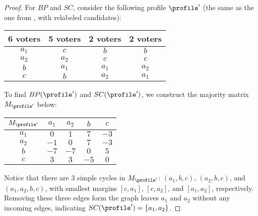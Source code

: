 \begin{proof}
For $BP$ and $SC$, consider the following profile $\profile'$ (the same as the one from , with relabeled candidates):

\begin{center}
\begin{tabular}{|c|c|c|c|}
    \hline
    6 voters & 5 voters & 2 voters & 2 voters \\ \hline
    \cellcolor{yellow!25} $a_1$ & \cellcolor{blue!25} $c$ & \cellcolor{green!25} $b$ & \cellcolor{green!25} $b$ \\ \hline
    \cellcolor{red!25} $a_2$ & \cellcolor{red!25} $a_2$ & \cellcolor{blue!25} $c$ & \cellcolor{blue!25} $c$ \\ \hline
    \cellcolor{green!25} $b$ & \cellcolor{yellow!25} $a_1$ & \cellcolor{yellow!25} $a_1$ & \cellcolor{red!25} $a_2$ \\ \hline
    \cellcolor{blue!25} $c$ & \cellcolor{green!25} $b$ & \cellcolor{red!25} $a_2$ & \cellcolor{yellow!25} $a_1$ \\
    \hline
\end{tabular}
\end{center}

To find $BP(\profile')$ and $SC(\profile')$, we construct the majority matrix $M_{\profile'}$ below:

\begin{center}
\begin{tabular}{|c|c|c|c|c|}
    \hline
    $M_{\profile'}$ & \cellcolor{yellow!25} $a_1$ & \cellcolor{red!25} $a_2$ & \cellcolor{green!25} $b$ & \cellcolor{blue!25} $c$ \\ \hline
    \cellcolor{yellow!25} $a_1$ & $0$ & $1$ & $7$ & $-3$ \\ \hline
    \cellcolor{red!25} $a_2$ & $-1$ & $0$ & $7$ & $-3$ \\ \hline
    \cellcolor{green!25} $b$ & $-7$ & $-7$ & $0$ & $5$ \\ \hline
    \cellcolor{blue!25} $c$ & $3$ & $3$ & $-5$ & $0$ \\ 
    \hline
\end{tabular}
\end{center}

Notice that there are 3 simple cycles in $M_{\profile'}$: $(a_1,b,c)$, $(a_2,b,c)$, and $(a_1,a_2,b,c)$, with smallest margins $[c,a_1]$, $[c,a_2]$, and $[a_1,a_2]$, respectively. Removing these three edges form the graph leaves $a_1$ and $a_2$ without any incoming edges, indicating $SC(\profile')=\{a_1,a_2\}$. 


\end{proof}
